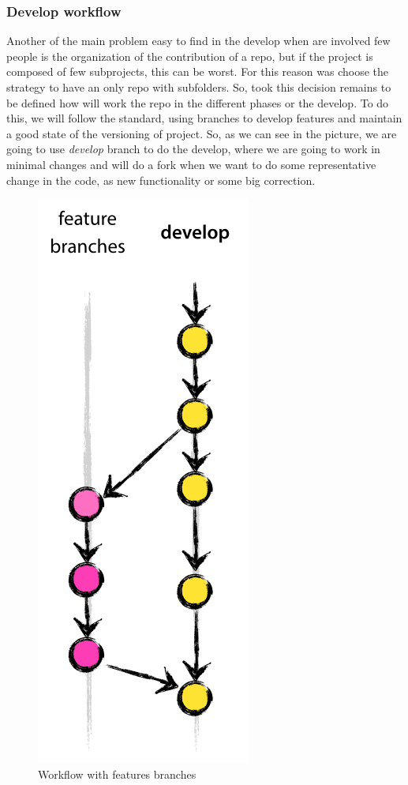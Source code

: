 \subsubsection{Develop workflow}

Another of the main problem easy to find in the develop when are involved
few people is the organization of the contribution of a repo, but if the project
is composed of few subprojects, this can be worst. For this reason was choose the
strategy to have an only repo with subfolders.
So, took this decision remains to be defined how will work the repo in the
different phases or the develop.
\intro
To do this, we will follow the standard, using branches to develop features and
maintain a good state of the versioning of project.
\intro
So, as we can see in the picture, we are going to use \textit{develop} branch
to do the develop, where we are going to work in minimal changes and will do
a fork when we want to do some representative change in the code, as new functionality or
some big correction.


\begin{figure}[H]
  \includegraphics[scale=0.25]{img/git/feature_branches.png}
  \centering
  \caption{Workflow with features branches}
\end{figure}

